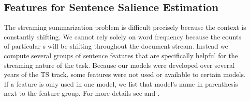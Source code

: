 %

\subsection{Features for Sentence Salience Estimation}
\label{sec:features}

The streaming summarization problem is difficult precisely because the context
is constantly shifting. We cannot rely solely on word frequency because
the counts of particular \ngram s will be shifting throughout the document
stream. Instead we compute several groups of sentence features that are
specifically helpful for the streaming nature of the task. 
Because our models were
developed over several years of the TS track, some
features were not used or available to certain models. If a feature
is only used in one model, we list that model's name in parenthesis next
to the feature group. For more details see \cite{kedzie2015predicting}
and \cite{kedzie2016real}.



